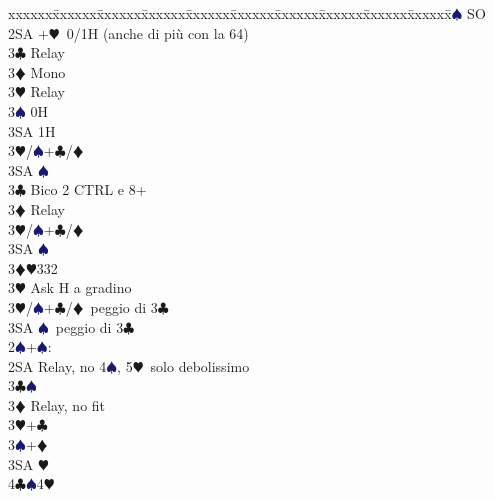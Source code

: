 \documentclass[a4paper,italian]{article}
\newcommand{\BC}{\textcolor{OliveGreen}{$\clubsuit$}}
\newcommand{\BD}{\textcolor{RedOrange}{$\vardiamondsuit$}}
\newcommand{\BH}{\textcolor{Red2}{$\varheartsuit${}}}
\newcommand{\BS}{\textcolor{MidnightBlue}{$\spadesuit${}}}
\newenvironment{bidtable}
{\begin{tabbing}

    xxxxxx\=xxxxxx\=xxxxxx\=xxxxxx\=xxxxxx\=xxxxxx\=xxxxxx\=xxxxxx\=xxxxxx\=xxxxxx\=\kill}
{\end{tabbing} }%
\begin{document}
\begin{multicols}{2}
\begin{bidtable}
                                            4\BS \> SO\-\-\\
                                            2SA +\BH\ 0/1H (anche di più con la 64)\+\\
                                            3\BC \> Relay\+\\
                                            3\BD \> Mono\+\\
                                            3\BH \> Relay\+\\
                                            3\BS \> 0H\\
                                            3SA \> 1H\-\-\\
                                            3\BH/\BS {}+\BC /\BD \\
                                            3SA \BS \-\-\\
                                            3\BC \> Bico 2 CTRL e 8+\+\\
                                            3\BD \> Relay\+\\
                                            3\BH/\BS {}+\BC /\BD \\
                                            3SA \BS \-\-\\
                                            3\BD {}\BH 332\+\\
                                            3\BH \> Ask H a gradino\-\\
                                            3\BH/\BS {}+\BC /\BD\ peggio di 3\BC \\
                                            3SA \BS\ peggio di 3\BC \-\\
                                            2\BS {}+\BS :\+\\
                                            2SA \> Relay, no 4\BS , 5\BH\ solo debolissimo\+\\
                                            3\BC {}\BS \+\\
                                            3\BD \> Relay, no fit\+\\
                                            3\BH {}+\BC \\
                                            3\BS {}+\BD \\
                                            3SA \BH \\
                                            4\BC {}\BS 4\BH\+\\

\end{bidtable}
\end{multicols}
\end{document}
